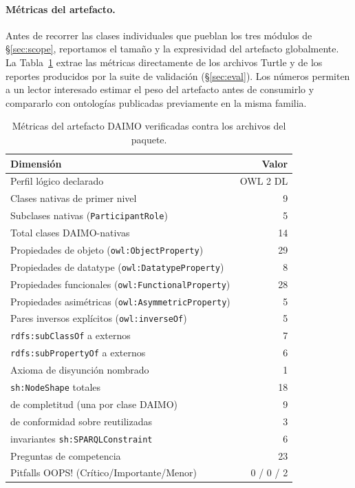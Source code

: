 \documentclass[11pt,a4paper]{article}
\newcommand{\code}[1]{\texttt{#1}}
\begin{document}
\paragraph{Métricas del artefacto.}\label{sec:metrics}

Antes de recorrer las clases individuales que pueblan los tres módulos de §\ref{sec:scope}, reportamos el tamaño y la expresividad del artefacto globalmente. La Tabla~\ref{tab:metrics} extrae las métricas directamente de los archivos Turtle y de los reportes producidos por la suite de validación (§\ref{sec:eval}). Los números permiten a un lector interesado estimar el peso del artefacto antes de consumirlo y compararlo con ontologías publicadas previamente en la misma familia.

\begin{table}[t]
\small\sf\centering
\caption{Métricas del artefacto DAIMO verificadas contra los archivos del paquete.\label{tab:metrics}}
\begin{tabular}{@{}p{4.6cm}r@{}}
\toprule
\textbf{Dimensión} & \textbf{Valor} \\
\midrule
Perfil lógico declarado & OWL 2 DL \\
Clases nativas de primer nivel & 9 \\
Subclases nativas (\code{ParticipantRole}) & 5 \\
Total clases DAIMO-nativas & 14 \\
Propiedades de objeto (\code{owl:ObjectProperty}) & 29 \\
Propiedades de datatype (\code{owl:DatatypeProperty}) & 8 \\
Propiedades funcionales (\code{owl:FunctionalProperty}) & 28 \\
Propiedades asimétricas (\code{owl:AsymmetricProperty}) & 5 \\
Pares inversos explícitos (\code{owl:inverseOf}) & 5 \\
\code{rdfs:subClassOf} a externos & 7 \\
\code{rdfs:subPropertyOf} a externos & 6 \\
Axioma de disyunción nombrado & 1 \\
\code{sh:NodeShape} totales & 18 \\
\quad de completitud (una por clase DAIMO) & 9 \\
\quad de conformidad sobre reutilizadas & 3 \\
\quad invariantes \code{sh:SPARQLConstraint} & 6 \\
Preguntas de competencia & 23 \\
Pitfalls OOPS! (Crítico/Importante/Menor) & 0 / 0 / 2 \\
\bottomrule
\end{tabular}
\end{table}
\end{document}
